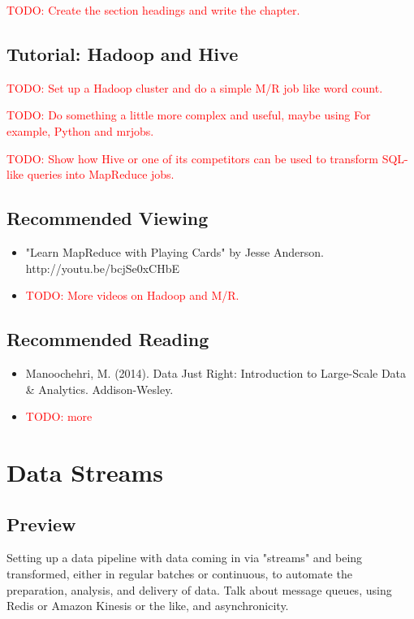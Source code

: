 \documentclass[11pt]{book}
\newcommand{\todo}[1]{\textcolor{red}{TODO: #1}} %
\begin{document}
\todo{Create the section headings and write the chapter.}

\section*{Tutorial: Hadoop and Hive}

\todo{Set up a Hadoop cluster and do a simple M/R job like word count.}

\todo{Do something a little more complex and useful, maybe using For example, Python and mrjobs.}

\todo{Show how Hive or one of its competitors can be used to transform SQL-like queries into MapReduce jobs.}

\section*{Recommended Viewing}
\begin{itemize}
    \item "Learn MapReduce with Playing Cards" by Jesse Anderson.\\  http://youtu.be/bcjSe0xCHbE
    \item \todo{More videos on Hadoop and M/R.}
\end{itemize}

\section*{Recommended Reading}
\begin{itemize}
    \item Manoochehri, M. (2014). Data Just Right: Introduction to Large-Scale Data \& Analytics. Addison-Wesley.
    \item \todo{more}
\end{itemize}








\chapter{Data Streams}

\section*{Preview}

Setting up a data pipeline with data coming in via "streams" and being transformed, either in regular batches or continuous, to automate the preparation, analysis, and delivery of data.  Talk about message queues, using Redis or Amazon Kinesis or the like, and asynchronicity.
\end{document}
